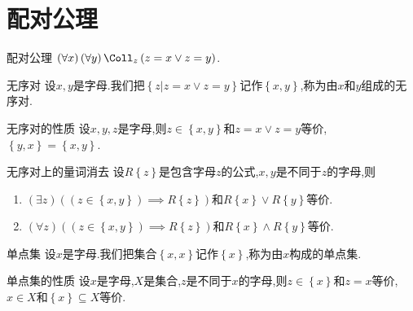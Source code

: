 \section{配对公理}

\begin{axiom}{配对公理}{}
	$\left(\forall x\right)\left(\forall y\right)\Coll_{z}\left(z=x\vee z=y\right)$.
\end{axiom}

\begin{definition}{无序对}{}
	设$x,y$是字母.我们把$\left\{z|z=x\vee z=y\right\}$记作$\left\{x,y\right\}$,称为由$x$和$y$组成的无序对.
\end{definition}

\begin{proposition}{无序对的性质}{}
	设$x,y,z$是字母,则$z\in\left\{x,y\right\}$和$z=x\vee z=y$等价,$\left\{y,x\right\}=\left\{x,y\right\}$.
\end{proposition}

\begin{proposition}{无序对上的量词消去}{}
	设$R\left\{z\right\}$是包含字母$z$的公式,$x,y$是不同于$z$的字母,则
	\begin{enumerate}
		\item $\left(\exists z\right)\left(\left(z\in\left\{x,y\right\}\right)\implies R\left\{z\right\}\right)$和$R\left\{x\right\}\vee R\left\{y\right\}$等价.
		\item $\left(\forall z\right)\left(\left(z\in\left\{x,y\right\}\right)\implies R\left\{z\right\}\right)$和$R\left\{x\right\}\wedge R\left\{y\right\}$等价.
	\end{enumerate}
\end{proposition}

\begin{definition}{单点集}{}
	设$x$是字母.我们把集合$\left\{x,x\right\}$记作$\left\{x\right\}$,称为由$x$构成的单点集.
\end{definition}

\begin{proposition}{单点集的性质}{}
	设$x$是字母,$X$是集合,$z$是不同于$x$的字母,则$z\in\left\{x\right\}$和$z=x$等价,$x\in X$和$\left\{x\right\}\subseteq X$等价.
\end{proposition}
